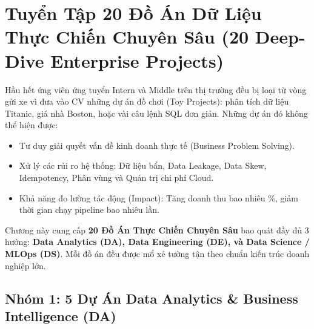\chapter{Tuyển Tập 20 Đồ Án Dữ Liệu Thực Chiến Chuyên Sâu (20 Deep-Dive Enterprise Projects)}

\begin{lythuyetbox}
Hầu hết ứng viên ứng tuyển Intern và Middle trên thị trường đều bị loại từ vòng gửi xe vì đưa vào CV những dự án đồ chơi (Toy Projects): phân tích dữ liệu Titanic, giá nhà Boston, hoặc vài câu lệnh SQL đơn giản. Những dự án đó không thể hiện được:
\begin{itemize}
    \item Tư duy giải quyết vấn đề kinh doanh thực tế (Business Problem Solving).
    \item Xử lý các rủi ro hệ thống: Dữ liệu bẩn, Data Leakage, Data Skew, Idempotency, Phân vùng và Quản trị chi phí Cloud.
    \item Khả năng đo lường tác động (Impact): Tăng doanh thu bao nhiêu \%, giảm thời gian chạy pipeline bao nhiêu lần.
\end{itemize}
Chương này cung cấp \textbf{20 Đồ Án Thực Chiến Chuyên Sâu} bao quát đầy đủ 3 hướng: \textbf{Data Analytics (DA), Data Engineering (DE), và Data Science / MLOps (DS)}. Mỗi đồ án đều được mổ xẻ tường tận theo chuẩn kiến trúc doanh nghiệp lớn.
\end{lythuyetbox}

\section{Nhóm 1: 5 Dự Án Data Analytics \& Business Intelligence (DA)}

